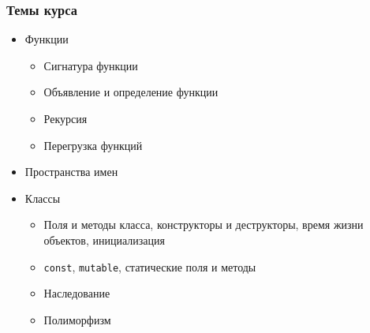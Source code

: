 \documentclass[compress]{beamer}
\begin{document}
\begin{frame}

    \frametitle{Темы курса}

    \begin{itemize}

        \item Функции

            \begin{itemize}

                \item Сигнатура функции

                \item Объявление и определение функции

                \item Рекурсия

                \item Перегрузка функций

            \end{itemize}

        \item Пространства имен

        \item Классы

            \begin{itemize}

                \item Поля и методы класса, конструкторы и деструкторы,
                    время жизни объектов, инициализация

                \item \texttt{const}, \texttt{mutable}, статические поля и методы

                \item Наследование

                \item Полиморфизм

            \end{itemize}

    \end{itemize}

\end{frame}
\end{document}
